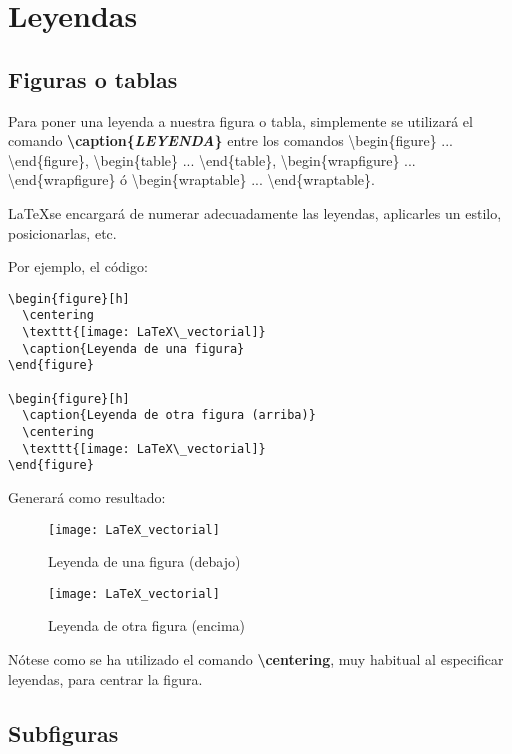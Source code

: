 \section{Leyendas}

\subsection{Figuras o tablas}

Para poner una leyenda a nuestra figura o tabla, simplemente se utilizará el comando \textbf{\textbackslash caption\{\emph{LEYENDA}\}} entre los comandos \textbackslash begin\{figure\} ... \textbackslash end\{figure\}, \textbackslash begin\{table\} ... \textbackslash end\{table\}, \textbackslash begin\{wrapfigure\} ... \textbackslash end\{wrapfigure\} ó \textbackslash begin\{wraptable\} ... \textbackslash end\{wraptable\}.

\LaTeX se encargará de numerar adecuadamente las leyendas, aplicarles un estilo, posicionarlas, etc.

Por ejemplo, el código:

\begin{lstlisting}[language={[LaTeX]Tex}]
\begin{figure}[h]
  \centering
  \texttt{[image: LaTeX\_vectorial]}
  \caption{Leyenda de una figura}	
\end{figure}

\begin{figure}[h]
  \caption{Leyenda de otra figura (arriba)}	
  \centering
  \texttt{[image: LaTeX\_vectorial]}
\end{figure}
\end{lstlisting}

Generará como resultado:

\begin{figure}[h]
	\centering
	\texttt{[image: LaTeX\_vectorial]}
	\caption{Leyenda de una figura (debajo)}	
\end{figure}

\begin{figure}[h]
  \caption{Leyenda de otra figura (encima)}	
  \centering
  \texttt{[image: LaTeX\_vectorial]}
\end{figure}

Nótese como se ha utilizado el comando \textbf{\textbackslash centering}, muy habitual al especificar leyendas, para centrar la figura.

\subsection{Subfiguras}

